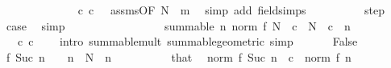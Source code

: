 \begin{isabellebody}
\ \ \ \ \ \ \ \ \ \ \isamarkupfalse%
\ {\isacartoucheopen}{}\ {\isacharless}{\kern0pt}\ c{\isacartoucheclose}\ {\isacartoucheopen}c\ {\isacharless}{\kern0pt}\ {}{\isacartoucheclose}\ assms{\isacharparenleft}{\kern0pt}{}{\isacharparenright}{\kern0pt}{\isacharbrackleft}{\kern0pt}OF\ {\isacartoucheopen}N\ {\isasymle}\ m{\isacartoucheclose}{\isacharbrackright}{\kern0pt}\ \isamarkupfalse%
\ {\isacharparenleft}{\kern0pt}simp\ add{\isacharcolon}{\kern0pt}\ field{\isacharunderscore}{\kern0pt}simps{\isacharparenright}{\kern0pt}\isanewline
\ \ \ \ \ \ \ \ \isamarkupfalse%
\ step\ \isamarkupfalse%
\ {\isacharquery}{\kern0pt}case\ \isamarkupfalse%
\ simp\isanewline
\ \ \ \ \ \ \isamarkupfalse%
\isanewline
\ \ \ \ \isamarkupfalse%
\isanewline
\ \ \ \ \isamarkupfalse%
\ {\isachardoublequoteopen}summable\ {\isacharparenleft}{\kern0pt}{\isasymlambda}n{\isachardot}{\kern0pt}\ norm\ {\isacharparenleft}{\kern0pt}f\ N{\isacharparenright}{\kern0pt}\ {\isacharslash}{\kern0pt}\ c\ {\isacharcircum}{\kern0pt}\ N\ {\isacharasterisk}{\kern0pt}\ c\ {\isacharcircum}{\kern0pt}\ n{\isacharparenright}{\kern0pt}{\isachardoublequoteclose}\isanewline
\ \ \ \ \ \ \isamarkupfalse%
\ {\isacartoucheopen}{}\ {\isacharless}{\kern0pt}\ c{\isacartoucheclose}\ {\isacartoucheopen}c\ {\isacharless}{\kern0pt}\ {}{\isacartoucheclose}\ \isamarkupfalse%
\ {\isacharparenleft}{\kern0pt}intro\ summable{\isacharunderscore}{\kern0pt}mult\ summable{\isacharunderscore}{\kern0pt}geometric{\isacharparenright}{\kern0pt}\ simp\isanewline
\ \ \isamarkupfalse%
\isanewline
{}\isamarkupfalse%
\isanewline
\ \ \isamarkupfalse%
\ False\isanewline
\ \ \isamarkupfalse%
\ {\isachardoublequoteopen}f\ {\isacharparenleft}{\kern0pt}Suc\ n{\isacharparenright}{\kern0pt}\ {\isacharequal}{\kern0pt}\ {}{\isachardoublequoteclose}\ \ {\isachardoublequoteopen}n\ {\isasymge}\ N{\isachardoublequoteclose}\ \ n\isanewline
\ \ \isamarkupfalse%
\ {\isacharminus}{\kern0pt}\isanewline
\ \ \ \ \isamarkupfalse%
\ that\ \isamarkupfalse%
\ {\isachardoublequoteopen}norm\ {\isacharparenleft}{\kern0pt}f\ {\isacharparenleft}{\kern0pt}Suc\ n{\isacharparenright}{\kern0pt}{\isacharparenright}{\kern0pt}\ {\isasymle}\ c\ {\isacharasterisk}{\kern0pt}\ norm\ {\isacharparenleft}{\kern0pt}f\ n{\isacharparenright}{\kern0pt}{\isachardoublequoteclose}\isanewline

\end{isabellebody}
